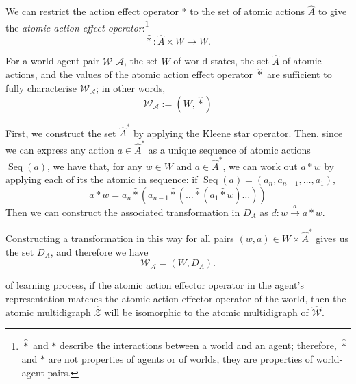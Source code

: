 We can restrict the action effect operator $\ast$ to the set of atomic actions $\hat{A}$ to give the \emph{atomic action effect operator}:\footnote{
    $\hat{\ast}$ and $\ast$ describe the interactions between a world and an agent; therefore, $\hat{\ast}$ and $\ast$ are not properties of agents or of worlds, they are properties of world-agent pairs.
}
\begin{equation}
    \hat{\ast}: \hat{A} \times W \to W.
\end{equation}

\begin{propositionE}
\label{prp:action_world_characterised_by_world_states_and_atomic_action_effect_operator}
    For a world-agent pair $\mathscr{W}$-$\mathscr{A}$, the set $W$ of world states, the set $\hat{A}$ of atomic actions, and the values of the atomic action effect operator $\hat{\ast}$ are sufficient to fully characterise $\mathscr{W}_{\mathscr{A}}$; in other words,
    \begin{equation}
        \mathscr{W}_{\mathscr{A}} := (W, \hat{\ast})
    \end{equation}
\end{propositionE}
\begin{proofE}
    First, we construct the set $\hat{A}^{*}$ by applying the Kleene star operator.
    Then, since we can express any action $a \in \hat{A}^{*}$ as a unique sequence of atomic actions $\operatorname{Seq}(a)$, we have that, for any $w \in W$ and $a \in \hat{A}^{*}$, we can work out $a \ast w$ by applying each of its the atomic in sequence:
    if $\operatorname{Seq}(a) = (a_{n}, a_{n-1}, \dots, a_{1})$,
    \begin{equation}
        a \ast w = a_{n} \hat{\ast} (a_{n-1} \hat{\ast} (\dots \hat{\ast} (a_{1} \hat{\ast} w)\dots))
    \end{equation}
    Then we can construct the associated transformation in $D_{A}$ as $d: w \xrightarrow{a} a \ast w$.
    
    Constructing a transformation in this way for all pairs $(w, a) \in W \times \hat{A}^{*}$ gives us the set $D_{A}$, and therefore we have
    \begin{equation}
        \mathscr{W}_{\mathscr{A}} = (W, D_{A}).
    \end{equation}
\end{proofE}


 of learning process, if the atomic action effector operator in the agent's representation matches the atomic action effector operator of the world, then the atomic multidigraph $\hat{\mathscr{Z}}$ will be isomorphic to the atomic multidigraph of $\hat{\mathscr{W}}$.

